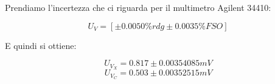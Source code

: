 \documentclass[a4paper]{article}
\begin{document}
Prendiamo l'incertezza che ci riguarda per il multimetro Agilent 34410:

\begin{Large} 
	\begin{equation}
		U_{V} = [\pm 0.0050\%rdg \pm 0.0035\% FSO]
	 \end{equation}
\end{Large}
E quindi si ottiene:
\begin{Large} 
	\begin{equation}
		U_{V_X} = 0.817 \pm 0.00354085 mV
	 \end{equation}
	 \begin{equation}
		U_{V_C} = 0.503 \pm 0.00352515 mV
	 \end{equation}
\end{Large}
\end{document}

